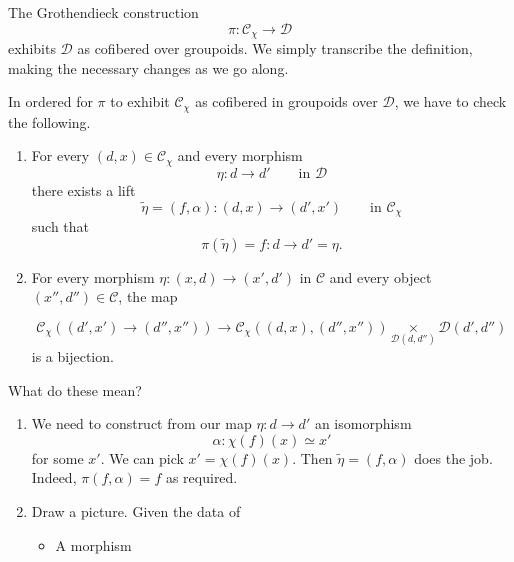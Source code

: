 \documentclass[main.tex]{subfiles}
\begin{document}
\begin{example}
  The Grothendieck construction
  \begin{equation*}
    \pi\colon \mathcal{C}_{\chi} \to \mathcal{D}
  \end{equation*}
  exhibits $\mathcal{D}$ as cofibered over groupoids. We simply transcribe the definition, making the necessary changes as we go along.

  In ordered for $\pi$ to exhibit $\mathcal{C}_{\chi}$ as cofibered in groupoids over $\mathcal{D}$, we have to check the following.
  \begin{enumerate}
    \item For every $(d, x) \in \mathcal{C}_{\chi}$ and every morphism
      \begin{equation*}
        \eta\colon d \to d'\qquad\text{in }\mathcal{D}
      \end{equation*}
      there exists a lift
      \begin{equation*}
        \tilde{\eta} = (f, \alpha) \colon (d, x) \to (d', x')\qquad\text{in }\mathcal{C}_{\chi}
      \end{equation*}
      such that
      \begin{equation*}
        \pi(\tilde{\eta}) = f\colon d \to d' = \eta.
      \end{equation*}

    \item For every morphism $\eta\colon (x, d) \to (x', d')$ in $\mathcal{C}$ and every object $(x'', d'') \in \mathcal{C}$, the map

      \begin{equation*}
        \mathcal{C}_{\chi}((d', x') \to (d'', x'')) \to\mathcal{C}_{\chi}((d, x), (d'', x'')) \underset{\mathcal{D}(d,d'')}{\times}\mathcal{D}(d', d'')
      \end{equation*}
      is a bijection.
  \end{enumerate}

  What do these mean?
  \begin{enumerate}
    \item We need to construct from our map $\eta\colon d \to d'$ an isomorphism
      \begin{equation*}
        \alpha\colon \chi(f)(x) \simeq x'
      \end{equation*}
      for some $x'$. We can pick $x' = \chi(f)(x)$. Then $\tilde{\eta} = (f, \alpha)$ does the job. Indeed, $\pi(f, \alpha) = f$ as required.

    \item Draw a picture. Given the data of
      \begin{itemize}
        \item A morphism
      \end{itemize}
  \end{enumerate}
\end{example}
\end{document}
